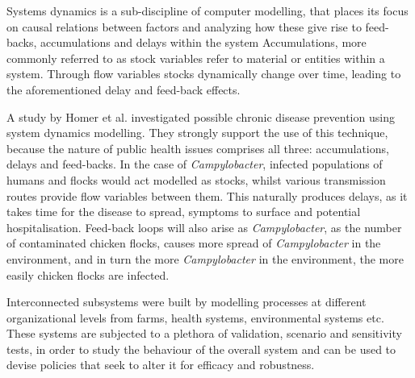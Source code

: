 
Systems dynamics is a sub-discipline of computer modelling, that places its focus on causal relations between factors and analyzing how these give rise to feed-backs, accumulations and delays within the system \parencite{} Accumulations, more commonly referred to as stock variables refer to material or entities within a system. Through flow variables stocks dynamically change over time, leading to the aforementioned delay and feed-back effects. 

A study by Homer et al. investigated possible chronic disease prevention using system dynamics modelling. They strongly support the use of this technique, because the nature of public health issues comprises all three: accumulations, delays and feed-backs\parencite{homer_system_2006}. In the case of \textit{Campylobacter}, infected populations of humans and flocks would act modelled as stocks, whilst various transmission routes provide flow variables between them. This naturally produces delays, as it takes time for the disease to spread, symptoms to surface and potential hospitalisation. Feed-back loops will also arise as \textit{Campylobacter}, as the number of contaminated chicken flocks, causes more spread of \textit{Campylobacter} in the environment, and in turn the more \textit{Campylobacter} in the environment, the more easily chicken flocks are infected. 

Interconnected subsystems were built by modelling processes at different organizational levels from farms, health systems, environmental systems etc. These systems are subjected to a plethora of validation, scenario and sensitivity tests, in order to study the behaviour of the overall system and can be used to devise policies that seek to alter it for efficacy and robustness. 


